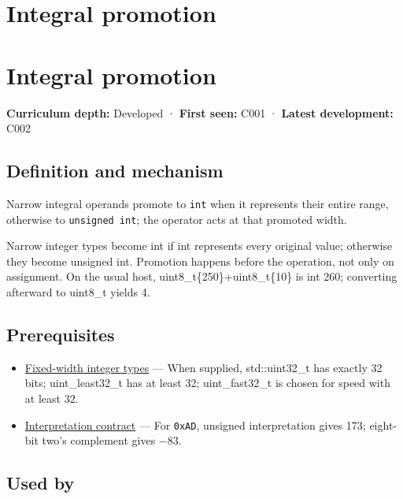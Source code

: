\hypertarget{appendix-45303d03796a}{}
\section*{Integral promotion}
\section{Integral promotion}\label{appendix-45303d03796a-integral-promotion}

\textbf{Curriculum depth:} Developed · \textbf{First seen:} C001 · \textbf{Latest development:} C002

\subsection{Definition and mechanism}\label{appendix-45303d03796a-definition-and-mechanism}

Narrow integral operands promote to \texttt{int} when it represents their entire range, otherwise to \texttt{unsigned\ int}; the operator acts at that promoted width.

Narrow integer types become int if int represents every original value; otherwise they become unsigned int. Promotion happens before the operation, not only on assignment. On the usual host, uint8\_t\{250\}+uint8\_t\{10\} is int 260; converting afterward to uint8\_t yields 4.

\subsection{Prerequisites}\label{appendix-45303d03796a-prerequisites}

\begin{itemize}
\tightlist
\item
  \hyperref[appendix-cc04044b5782]{Fixed-width integer types} --- When supplied, std::uint32\_t has exactly 32 bits; uint\_least32\_t has at least 32; uint\_fast32\_t is chosen for speed with at least 32.
\item
  \hyperref[appendix-f414bd4ed05c]{Interpretation contract} --- For \texttt{0xAD}, unsigned interpretation gives 173; eight-bit two's complement gives −83.
\end{itemize}

\subsection{Used by}\label{appendix-45303d03796a-used-by}

